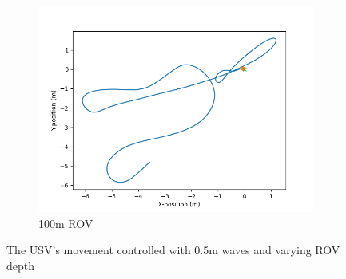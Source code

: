 \documentclass[class=article, crop=false]{standalone}
\begin{document}
\begin{figure}
\begin{subfigure}{0.7\textwidth}
        \includegraphics{scenario1/rov-100m/0.5m/usv_position_controlled}
        \caption{100m ROV}
    \end{subfigure}
    \caption{The USV's movement controlled with 0.5m waves and varying ROV depth}
    \label{fig:0.5m-controlled}
\end{figure}
\end{document}

